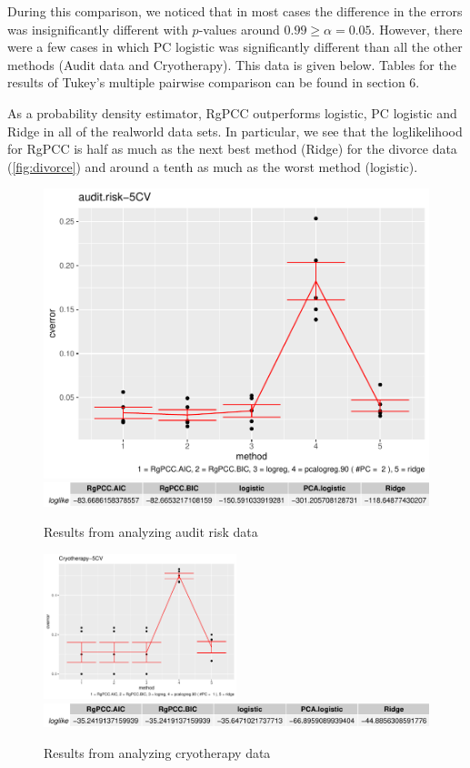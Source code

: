 \documentclass[main.tex]{subfiles}
\begin{document}
During this comparison, we noticed that in most cases the difference in the errors was insignificantly different with $p$-values around $0.99 \geq \alpha = 0.05$. However, there were a few cases in which PC logistic was significantly different than all the other methods (Audit data and Cryotherapy). This data is given below. Tables for the results of Tukey's multiple pairwise comparison can be found in section 6.

As a probability density estimator, RgPCC outperforms logistic, PC logistic and Ridge in all of the realworld data sets. In particular, we see that the loglikelihood for RgPCC is half as much as the next best method (Ridge) for the divorce data (\ref{fig:divorce}) and around a tenth as much as the worst method (logistic). 


\begin{figure}[H]
	\includegraphics[width = 0.5 \textwidth]{R-code/data/audit.risk-5CVgraph.pdf}
	\includegraphics[width = \textwidth]{R-code/data/audit.risk-5CVloglike.pdf}
	\label{fig:audit}
	\caption{Results from analyzing audit risk data}
\end{figure}

\begin{figure}[H]
    \centering

    \includegraphics[width = 0.5\textwidth]{R-code/data/Cryotherapy-5CVgraph.pdf}
    \includegraphics[width = \textwidth]{R-code/data/Cryotherapy-5CVloglike.pdf}
    \label{fig:cryo}
    \caption{Results from analyzing cryotherapy data}
\end{figure}
\end{document}
